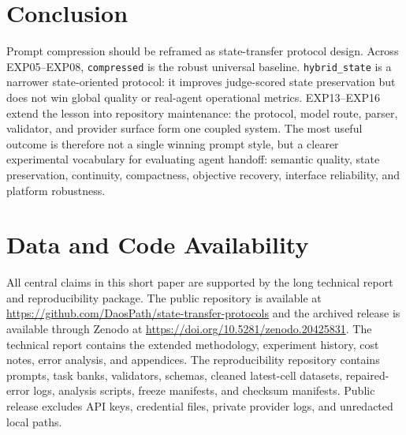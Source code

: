 \documentclass[11pt]{article}
\begin{document}
\section{Conclusion}
Prompt compression should be reframed as state-transfer protocol design. Across EXP05--EXP08, \texttt{compressed} is the robust universal baseline. \texttt{hybrid\_state} is a narrower state-oriented protocol: it improves judge-scored state preservation but does not win global quality or real-agent operational metrics. EXP13--EXP16 extend the lesson into repository maintenance: the protocol, model route, parser, validator, and provider surface form one coupled system. The most useful outcome is therefore not a single winning prompt style, but a clearer experimental vocabulary for evaluating agent handoff: semantic quality, state preservation, continuity, compactness, objective recovery, interface reliability, and platform robustness.

\FloatBarrier
\section*{Data and Code Availability}
All central claims in this short paper are supported by the long technical report and reproducibility package. The public repository is available at \url{https://github.com/DaosPath/state-transfer-protocols} and the archived release is available through Zenodo at \url{https://doi.org/10.5281/zenodo.20425831}. The technical report contains the extended methodology, experiment history, cost notes, error analysis, and appendices. The reproducibility repository contains prompts, task banks, validators, schemas, cleaned latest-cell datasets, repaired-error logs, analysis scripts, freeze manifests, and checksum manifests. Public release excludes API keys, credential files, private provider logs, and unredacted local paths.
\end{document}
